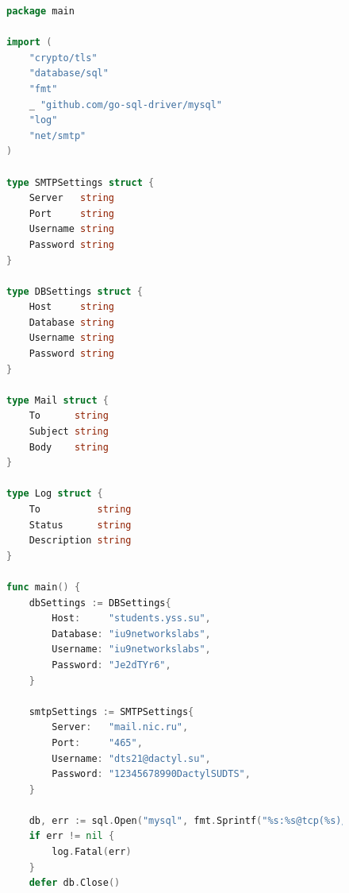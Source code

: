 \documentclass[a4paper, 14pt]{extarticle}
\begin{document}
\begin{figure}[!htb]
\begin{lstlisting}[language={Go},caption={app.go},label={lst:code2}]
package main

import (
	"crypto/tls"
	"database/sql"
	"fmt"
	_ "github.com/go-sql-driver/mysql"
	"log"
	"net/smtp"
)

type SMTPSettings struct {
	Server   string
	Port     string
	Username string
	Password string
}

type DBSettings struct {
	Host     string
	Database string
	Username string
	Password string
}

type Mail struct {
	To      string
	Subject string
	Body    string
}

type Log struct {
	To          string
	Status      string
	Description string
}

func main() {
	dbSettings := DBSettings{
		Host:     "students.yss.su",
		Database: "iu9networkslabs",
		Username: "iu9networkslabs",
		Password: "Je2dTYr6",
	}

	smtpSettings := SMTPSettings{
		Server:   "mail.nic.ru",
		Port:     "465",
		Username: "dts21@dactyl.su",
		Password: "12345678990DactylSUDTS",
	}

	db, err := sql.Open("mysql", fmt.Sprintf("%s:%s@tcp(%s)/%s", dbSettings.Username, dbSettings.Password, dbSettings.Host, dbSettings.Database))
	if err != nil {
		log.Fatal(err)
	}
	defer db.Close()
\end{lstlisting}
\end{figure}
\end{document}
